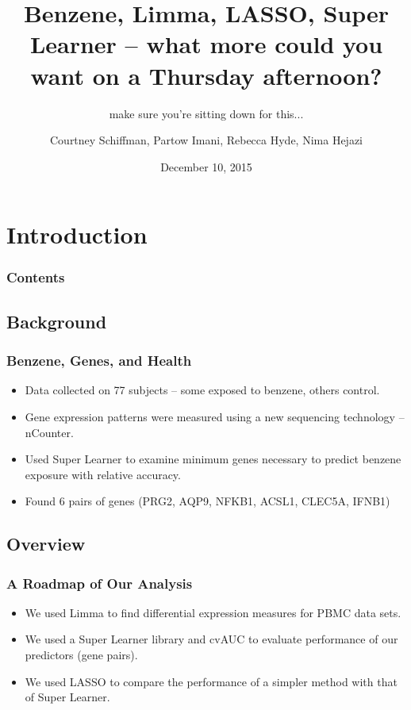 \documentclass{beamer}
\title{Benzene, Limma, LASSO, Super Learner -- what more could you want on a Thursday afternoon?}
\subtitle{make sure you're sitting down for this...}
\author{Courtney Schiffman, Partow Imani, Rebecca Hyde, Nima Hejazi}
\institute[UC Berkeley]{University of California, Berkeley}
\date{December 10, 2015}
\begin{document}
\frame{\titlepage}

\section[Outline]{}
\frame{\tableofcontents}


\section{Introduction}

\begin{frame}
	\frametitle{Contents}
	\tableofcontents[currentsection,currentsubsection,hideothersubsections,sectionstyle=show/shaded] 
\end{frame}


\subsection{Background}

\begin{frame}[fragile]
  	\frametitle{Benzene, Genes, and Health}
  		\begin{itemize}
  			\item Data collected on 77 subjects -- some exposed to benzene, others control.
			\item Gene expression patterns were measured using a new sequencing technology -- nCounter.
 			\item Used Super Learner to examine minimum genes necessary to predict benzene exposure with relative accuracy.
  			\item Found 6 pairs of genes (PRG2, AQP9, NFKB1, ACSL1, CLEC5A, IFNB1)
  		\end{itemize}
\end{frame}

\subsection{Overview}

\begin{frame}[fragile]
  	\frametitle{A Roadmap of Our Analysis}
 		\begin{itemize}
  			\item We used Limma to find differential expression measures for PBMC data sets.
 			\item We used a Super Learner library and cvAUC to evaluate performance of our predictors (gene pairs).
  			\item We used LASSO to compare the performance of a simpler method with that of Super Learner.
  		\end{itemize}
\end{frame}
\end{document}
